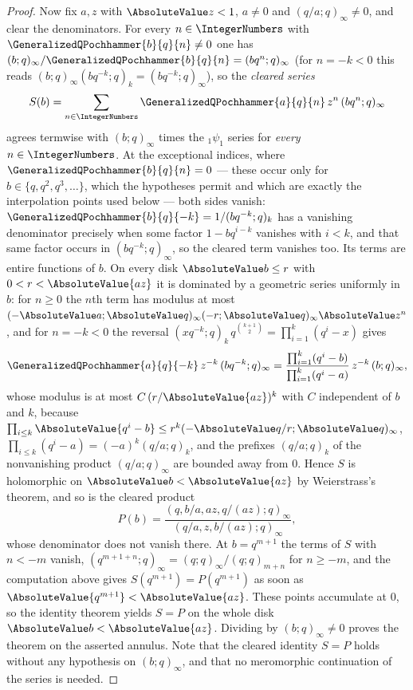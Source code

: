 \documentclass[11pt,a4paper,oneside,openany]{book}
\theoremstyle{definition}
\theoremstyle{remark}
\begin{document}
\begin{proof}
Now fix $a,z$ with $\AbsoluteValue z<1$, $a\ne0$ and $(q/a;q)_\infty\ne0$, and
clear the denominators.  For every $n\in\IntegerNumbers$ with
$\GeneralizedQPochhammer{b}{q}{n}\ne0$ one has
$(b;q)_\infty/\GeneralizedQPochhammer{b}{q}{n}=(bq^{n};q)_\infty$ (for $n=-k<0$ this reads
$(b;q)_\infty(bq^{-k};q)_k=(bq^{-k};q)_\infty$), so the \emph{cleared series}
\[
 S(b)=\sum_{n\in\IntegerNumbers}\GeneralizedQPochhammer{a}{q}{n}\,z^{n}\,(bq^{n};q)_\infty
\]
agrees termwise with $(b;q)_\infty$ times the ${}_1\psi_1$ series for \emph{every}
$n\in\IntegerNumbers$.  At the exceptional indices, where
$\GeneralizedQPochhammer{b}{q}{n}=0$ --- these occur only for $b\in\{q,q^2,q^3,\ldots\}$, which
the hypotheses permit and which are exactly the interpolation points used below --- both sides
vanish: $\GeneralizedQPochhammer{b}{q}{-k}=1/(bq^{-k};q)_k$ has a vanishing denominator
precisely when some factor $1-bq^{i-k}$ vanishes with $i<k$, and that same factor occurs in
$(bq^{-k};q)_\infty$, so the cleared term vanishes too.  Its
terms are entire functions of $b$.  On every disk $\AbsoluteValue b\le r$ with
$0<r<\AbsoluteValue{az}$ it is dominated by a geometric series uniformly in $b$: for $n\ge0$
the $n$th term has modulus at most
$(-\AbsoluteValue a;\AbsoluteValue q)_\infty(-r;\AbsoluteValue q)_\infty\AbsoluteValue z^{n}$,
and for $n=-k<0$ the reversal
$(xq^{-k};q)_k\,q^{\binom{k+1}{2}}=\prod_{i=1}^{k}(q^{i}-x)$ gives
\[
 \GeneralizedQPochhammer{a}{q}{-k}\,z^{-k}\,(bq^{-k};q)_\infty
 =\frac{\prod_{i=1}^{k}(q^{i}-b)}{\prod_{i=1}^{k}(q^{i}-a)}\,z^{-k}\,(b;q)_\infty,
\]
whose modulus is at most $C\,(r/\AbsoluteValue{az})^{k}$ with $C$ independent of $b$ and
$k$, because $\prod_{i\le k}\AbsoluteValue{q^{i}-b}\le r^{k}(-\AbsoluteValue q/r;\AbsoluteValue q)_\infty$,
$\prod_{i\le k}(q^{i}-a)=(-a)^{k}(q/a;q)_k$, and the prefixes $(q/a;q)_k$ of the
nonvanishing product $(q/a;q)_\infty$ are bounded away from $0$.  Hence $S$ is holomorphic
on $\AbsoluteValue b<\AbsoluteValue{az}$ by Weierstrass's theorem, and so is the cleared
product
\[
 P(b)=\frac{(q,b/a,az,q/(az);q)_\infty}{(q/a,z,b/(az);q)_\infty},
\]
whose denominator does not vanish there.  At $b=q^{m+1}$ the terms of $S$ with $n<-m$
vanish, $(q^{m+1+n};q)_\infty=(q;q)_\infty/(q;q)_{m+n}$ for $n\ge-m$, and the computation
above gives $S(q^{m+1})=P(q^{m+1})$ as soon as $\AbsoluteValue{q^{m+1}}<\AbsoluteValue{az}$.
These points accumulate at $0$, so the identity theorem yields $S=P$ on the whole disk
$\AbsoluteValue b<\AbsoluteValue{az}$.  Dividing by $(b;q)_\infty\ne0$ proves the theorem on
the asserted annulus.  Note that the cleared identity $S=P$ holds without any hypothesis on
$(b;q)_\infty$, and that no meromorphic continuation of the series is needed.
\end{proof}
\end{document}
